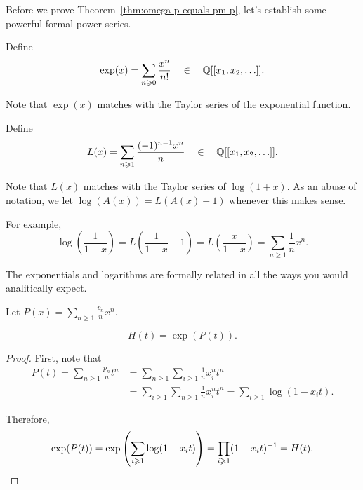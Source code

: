 Before we prove Theorem~\ref{thm:omega-p-equals-pm-p},
let's establish some powerful formal power series.

\begin{definition}
	Define
	\begin{equation}
		\exp(x) = \sum_{n \geq 0} \frac{x^n}{n!} \quad \in \quad \rationals[[x_1, x_2, \ldots]].
	\end{equation}
\end{definition}
Note that \(\exp(x)\) matches with the Taylor series of the exponential function.

\begin{definition}
	Define
	\begin{equation}
		L(x) = \sum_{n \geq 1} \frac{(-1)^{n-1}x^n}{n} \quad \in \quad \rationals[[x_1, x_2, \ldots]].
	\end{equation}
\end{definition}
Note that \(L(x)\) matches with the Taylor series of \(\log(1+x)\).
As an abuse of notation, we let \(\log(A(x)) = L(A(x) - 1)\) whenever this makes sense.

For example,
\begin{equation}
	\log\left( \frac{1}{1 - x} \right)
	= L\left( \frac{1}{1 - x} - 1 \right)
	= L\left( \frac{x}{1 - x} \right) 
	= \sum_{n \geq 1} \frac{1}{n} x^n.
\end{equation}

The exponentials and logarithms are formally related in all the ways you would analitically expect.

Let \(P(x) = \sum_{n \geq 1} \frac{p_n}{n} x^n\).

\begin{lemma} \label{lem:H-equals-exp-P}
	\begin{equation}
		H(t) = \exp(P(t)).
	\end{equation}
\end{lemma}

\begin{proof}
	First, note that
	\begin{align}
		P(t)
		= \sum_{n \geq 1} \frac{p_n}{n} t^n
		&= \sum_{n \geq 1} \sum_{i \geq 1} \frac{1}{n} x_i^n t^n\\
		&= \sum_{i \geq 1} \sum_{n \geq 1} \frac{1}{n} x_i^n t^n
		= \sum_{i \geq 1} \log(1 - x_it).
	\end{align}

	Therefore,
	\begin{equation}
		\exp(P(t))
		= \exp\left( \sum_{i \geq 1} \log(1 - x_it) \right)
		= \prod_{i \geq 1} (1 - x_it)^{-1}
		= H(t). \qedhere
	\end{equation}
\end{proof}

